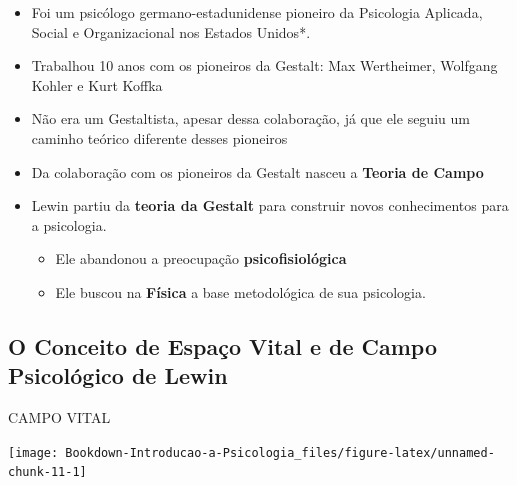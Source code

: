 \documentclass[
]{book}
\providecommand{\tightlist}{%
  \setlength{\itemsep}{0pt}\setlength{\parskip}{0pt}}
\begin{document}
\begin{itemize}
\tightlist
\item
  Foi um psicólogo germano-estadunidense pioneiro da Psicologia Aplicada, Social e Organizacional nos Estados Unidos*.
\item
  Trabalhou 10 anos com os pioneiros da Gestalt: Max Wertheimer, Wolfgang Kohler e Kurt Koffka
\item
  Não era um Gestaltista, apesar dessa colaboração, já que ele seguiu um caminho teórico diferente desses pioneiros
\item
  Da colaboração com os pioneiros da Gestalt nasceu a \textbf{Teoria de Campo}
\item
  Lewin partiu da \textbf{teoria da Gestalt} para construir novos conhecimentos para a psicologia.

  \begin{itemize}
  \tightlist
  \item
    Ele abandonou a preocupação \textbf{psicofisiológica}
  \item
    Ele buscou na \textbf{Física} a base metodológica de sua psicologia.
  \end{itemize}
\end{itemize}

\hypertarget{o-conceito-de-espauxe7o-vital-e-de-campo-psicoluxf3gico-de-lewin}{%
\subsection{\texorpdfstring{O Conceito de \textbf{Espaço Vital} e de \textbf{Campo Psicológico} de Lewin}{O Conceito de Espaço Vital e de Campo Psicológico de Lewin}}\label{o-conceito-de-espauxe7o-vital-e-de-campo-psicoluxf3gico-de-lewin}}

CAMPO VITAL

\texttt{[image: Bookdown-Introducao-a-Psicologia\_files/figure-latex/unnamed-chunk-11-1]}
\end{document}
